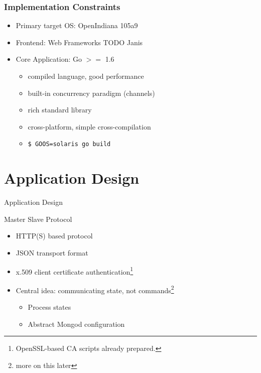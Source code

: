 \documentclass[11pt,aspectratio=169]{beamer}
\begin{document}
    \begin{frame}
        \frametitle{Implementation Constraints}
        \begin{itemize}
            \item<2-> Primary target OS: OpenIndiana 105a9
            \item<3-> Frontend: Web Frameworks TODO Janis %
            \item<4-> Core Application: Go $>=$ 1.6
            \begin{itemize}
                \item<5-> compiled language, good performance
                \item<6-> built-in concurrency paradigm (channels)
                \item<7-> rich standard library
                \item<8-> cross-platform, simple cross-compilation 
                \item<9->\texttt{\$ GOOS=solaris go build}
            \end{itemize}
        \end{itemize}
        
    \end{frame}
        
   
    
    \section{Application Design}
    
    \begin{frame}[label=appdesign]{Application Design}
    \end{frame}
       
   \begin{frame}{Master Slave Protocol}
       \begin{itemize}
           \item HTTP(S) based protocol
           \item JSON transport format
           \item x.509 client certificate authentication\footnote{OpenSSL-based CA scripts already prepared.}
           \item Central idea: communicating state, not commands\footnote{more on this later}
           \begin{itemize}
               \item Process states
               \item Abstract Mongod configuration
            \end{itemize}
        \end{itemize}
    \end{frame}
    
\end{document}
